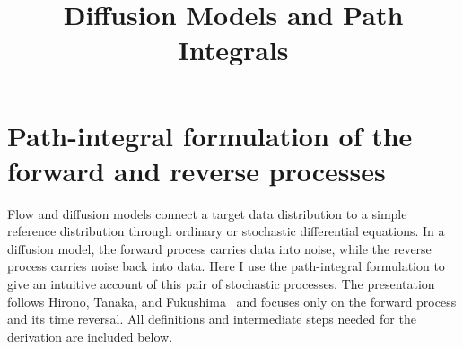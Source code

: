 \documentclass[11pt]{article}
\title{Diffusion Models and Path Integrals}
\author{}
\date{}
\begin{document}
\maketitle

\section{Path-integral formulation of the forward and reverse processes}

Flow and diffusion models connect a target data distribution to a simple reference
distribution through ordinary or stochastic differential equations. In a diffusion
model, the forward process carries data into noise, while the reverse process carries
noise back into data. Here I use the path-integral formulation to give an intuitive
account of this pair of stochastic processes. The presentation follows
Hirono, Tanaka, and Fukushima~\cite{hirono2024} and focuses only on the forward
process and its time reversal. All definitions and intermediate steps needed for
the derivation are included below.
\end{document}
